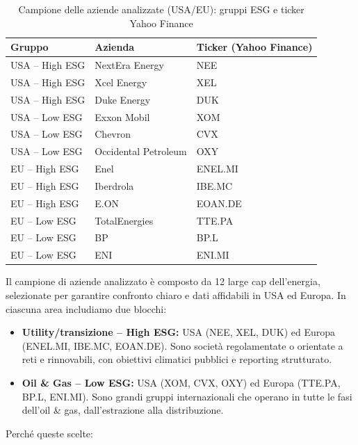 \documentclass[12pt,a4paper]{article}
\begin{document}
\begin{table}[H]
\centering
\caption{Campione delle aziende analizzate (USA/EU): gruppi ESG e ticker Yahoo Finance}
\small
\begin{tabular}{lll}
\toprule
\textbf{Gruppo} & \textbf{Azienda} & \textbf{Ticker (Yahoo Finance)} \\
\midrule
USA -- High ESG & NextEra Energy & NEE \\
USA -- High ESG & Xcel Energy & XEL \\
USA -- High ESG & Duke Energy & DUK \\
USA -- Low ESG & Exxon Mobil & XOM \\
USA -- Low ESG & Chevron & CVX \\
USA -- Low ESG & Occidental Petroleum & OXY \\
EU -- High ESG & Enel & ENEL.MI \\
EU -- High ESG & Iberdrola & IBE.MC \\
EU -- High ESG & E.ON & EOAN.DE \\
EU -- Low ESG & TotalEnergies & TTE.PA \\
EU -- Low ESG & BP & BP.L \\
EU -- Low ESG & ENI & ENI.MI \\
\bottomrule
\end{tabular}
\end{table}

Il campione di aziende analizzato è composto da 12 large cap dell'energia, selezionate per garantire confronto chiaro e dati affidabili in USA ed Europa. In ciascuna area includiamo due blocchi:

\begin{itemize}
\item \textbf{Utility/transizione -- High ESG:} USA (NEE, XEL, DUK) ed Europa (ENEL.MI, IBE.MC, EOAN.DE). Sono società regolamentate o orientate a reti e rinnovabili, con obiettivi climatici pubblici e reporting strutturato.
\item \textbf{Oil \& Gas -- Low ESG:} USA (XOM, CVX, OXY) ed Europa (TTE.PA, BP.L, ENI.MI). Sono grandi gruppi internazionali che operano in tutte le fasi dell'oil \& gas, dall'estrazione alla distribuzione.
\end{itemize}

Perché queste scelte:
\end{document}
